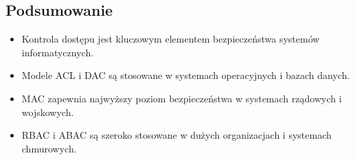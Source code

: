 \subsection{Podsumowanie}
\begin{itemize}
    \item Kontrola dostępu jest kluczowym elementem bezpieczeństwa systemów informatycznych.
    \item Modele ACL i DAC są stosowane w systemach operacyjnych i bazach danych.
    \item MAC zapewnia najwyższy poziom bezpieczeństwa w systemach rządowych i wojskowych.
    \item RBAC i ABAC są szeroko stosowane w dużych organizacjach i systemach chmurowych.
\end{itemize}
